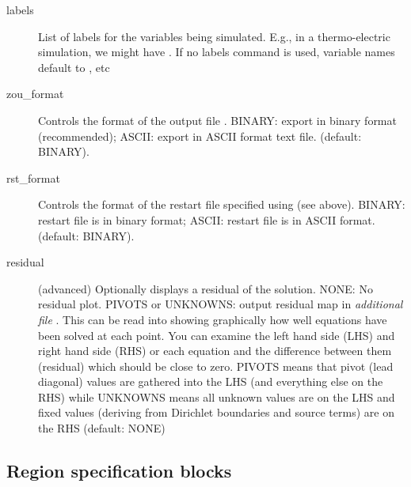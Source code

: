 \documentclass[a4paper,twoside,11pt]{book}
\begin{document}
\begin{description}
\item[labels] List of  labels for the variables being
  simulated. E.g., in a thermo-electric simulation, we might have
  . If no labels command is used, variable names
  default to ,  etc

\item[zou\_format] Controls the format of the output file
  . BINARY: export in binary format (recommended);
  ASCII: export in ASCII format text file. (default: BINARY).

\item[rst\_format] Controls the format of the restart file
  specified using  (see above). BINARY: restart file is in binary format;
  ASCII: restart file is in ASCII format. (default: BINARY).

\item[residual] (advanced) Optionally displays a residual of the
  solution. NONE: No residual plot. PIVOTS or UNKNOWNS: output
  residual map in \emph{additional file} . This
  can be read into  showing graphically how well equations
  have been solved at each point. You can examine the left hand side
  (LHS) and right hand side (RHS) or each equation and the difference
  between them (residual) which should be close to zero. PIVOTS means
  that pivot (lead diagonal) values are gathered into the LHS (and
  everything else on the RHS) while UNKNOWNS means all unknown values
  are on the LHS and fixed values (deriving from Dirichlet boundaries
  and source terms) are on the RHS (default: NONE)
\end{description}

\subsection{Region specification blocks}
\label{regionspec}
\end{document}
